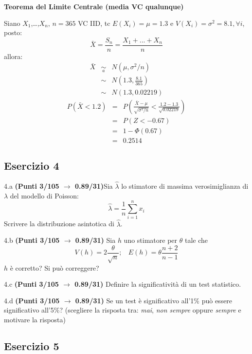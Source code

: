 \documentclass[
  11pt,
]{book}
\theoremstyle{mytheoremstyle}
\theoremstyle{mydefstyle}
\newenvironment{sol}
  {
  \begin{tcolorbox}[enhanced,breakable,arc=0.1mm,boxrule=1pt,colback=white,colframe=iblue,
  title=\bf \fontfamily{lmss}\selectfont \hspace{.5 cm} Soluzione,drop fuzzy shadow]

}{
\end{tcolorbox}
  }
\begin{document}
\begin{sol}
\textbf{Teorema del Limite Centrale (media VC qualunque)}

Siano \(X_1\),\ldots,\(X_n\), \(n=365\) VC IID, tc \(E(X_i)=\mu=1.3\) e \(V(X_i)=\sigma^2=8.1,\forall i\), posto:
\[
      \bar X=\frac{S_n}n =\frac{X_1 + ... + X_n}n
      \]
allora:\begin{eqnarray*}
  \bar X & \mathop{\sim}\limits_{a}& N(\mu,\sigma^2/n) \\
     &\sim & N\left(1.3,\frac{8.1}{365}\right) \\
     &\sim & N(1.3,0.02219)
  \end{eqnarray*}\begin{eqnarray*}
      P( \bar X   <   1.2 ) 
        &=& P\left(  \frac { \bar X  -  \mu }{ \sqrt{\sigma^2/n} }  <  \frac { 1.2  -  1.3 }{\sqrt{ 0.02219 }} \right)  \\
                 &=& P\left(  Z   <   -0.67 \right) \\    
                 &=&  1-\Phi( 0.67 ) \\ &=&  0.2514 
      \end{eqnarray*}

\end{sol}

\subsection{Esercizio 4}\label{esercizio-4-28}

4.a \textbf{(Punti 3/105 \(\rightarrow\) 0.89/31)}Sia \(\hat \lambda\) lo stimatore di massima verosimiglianza di \(\lambda\) del modello di Poisson:
\[\hat\lambda =  \frac 1n\sum_{i=1}^nx_i\]
Scrivere la distribuzione asintotica di \(\hat \lambda\).

4.b \textbf{(Punti 3/105 \(\rightarrow\) 0.89/31)} Sia \(h\) uno stimatore per \(\theta\) tale che
\[V(h)=2\frac\theta {\sqrt{n}};~~~~E(h)=\theta\frac{n+2}{n-1}\]
\(h\) è corretto? Si può correggere?

4.c \textbf{(Punti 3/105 \(\rightarrow\) 0.89/31)} Definire la significatività di un test statistico.

4.d \textbf{(Punti 3/105 \(\rightarrow\) 0.89/31)} Se un test è significativo all'1\% può essere significativo all'5\%? (scegliere la risposta tra: \emph{mai}, \emph{non sempre} oppure \emph{sempre} e motivare la risposta)

\subsection{Esercizio 5}\label{esercizio-5-27}
\end{document}
